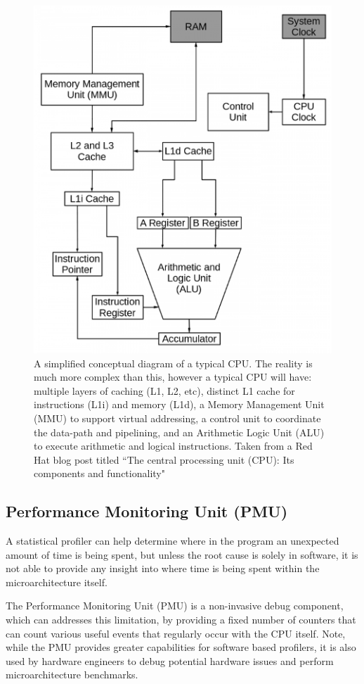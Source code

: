 {\begin{figure}[!ht]
    \centering
    \includegraphics[width=0.5\linewidth]{redhat_cpu_vis}
    \caption{A simplified conceptual diagram of a typical CPU. The reality is much more complex than this, however a typical CPU will have: multiple layers of caching (L1, L2, etc), distinct L1 cache for instructions (L1i) and memory (L1d), a Memory Management Unit (MMU) to support virtual addressing, a control unit to coordinate the data-path and pipelining, and an Arithmetic Logic Unit (ALU) to execute arithmetic and logical instructions. Taken from a Red Hat blog post titled ``The central processing unit (CPU): Its components and functionality" \cite{BlogRedHatCPU} } 
    \label{fig:cpu_vis}
\end{figure}

\subsection{Performance Monitoring Unit (PMU)}\label{sect:pmu}

A statistical profiler can help determine where in the program an unexpected amount of time is being spent, but unless the root cause is solely in software, it is not able to provide any insight into where time is being spent within the microarchitecture itself.

The Performance Monitoring Unit (PMU) is a non-invasive debug component, which can addresses this limitation, by providing a fixed number of counters that can count various useful events that regularly occur with the CPU itself. Note, while the PMU provides greater capabilities for software based profilers, it is also used by hardware engineers to debug potential hardware issues and perform microarchitecture benchmarks.

}
